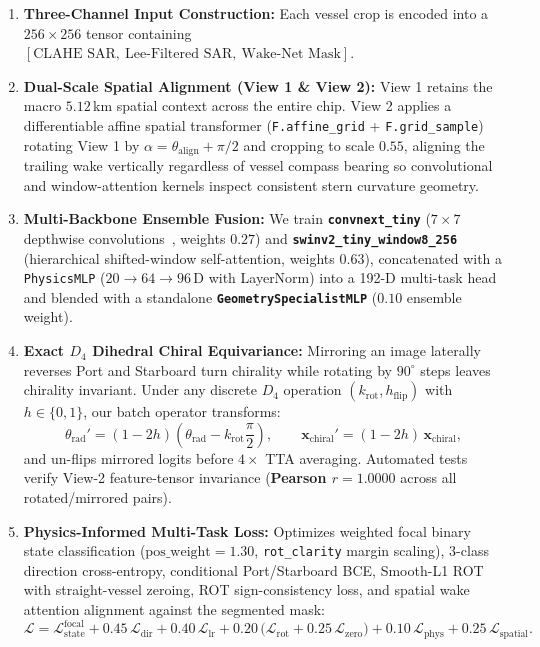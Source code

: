 \documentclass[11pt,a4paper]{article}
\begin{document}
\begin{enumerate}[leftmargin=1.5em]
    \item \textbf{Three-Channel Input Construction:} Each vessel crop is encoded into a $256\times 256$ tensor containing $[\text{CLAHE SAR},\ \text{Lee-Filtered SAR},\ \text{Wake-Net Mask}]$.
    \item \textbf{Dual-Scale Spatial Alignment (View 1 \& View 2):} View 1 retains the macro $5.12$\,km spatial context across the entire chip. View 2 applies a differentiable affine spatial transformer (\texttt{F.affine\_grid} + \texttt{F.grid\_sample}) rotating View 1 by $\alpha = \theta_{\text{align}} + \pi/2$ and cropping to scale $0.55$, aligning the trailing wake vertically regardless of vessel compass bearing so convolutional and window-attention kernels inspect consistent stern curvature geometry.
    \item \textbf{Multi-Backbone Ensemble Fusion:} We train \textbf{\texttt{convnext\_tiny}} ($7\times 7$ depthwise convolutions~\cite{liu2022convnext}, weights $0.27$) and \textbf{\texttt{swinv2\_tiny\_window8\_256}} (hierarchical shifted-window self-attention, weights $0.63$), concatenated with a \texttt{PhysicsMLP} ($20\rightarrow 64\rightarrow 96$\,D with LayerNorm) into a 192-D multi-task head and blended with a standalone \textbf{\texttt{GeometrySpecialistMLP}} ($0.10$ ensemble weight).
    \item \textbf{Exact $D_4$ Dihedral Chiral Equivariance:} Mirroring an image laterally reverses Port and Starboard turn chirality while rotating by $90^\circ$ steps leaves chirality invariant. Under any discrete $D_4$ operation $(k_{\text{rot}}, h_{\text{flip}})$ with $h\in\{0,1\}$, our batch operator transforms:
    \begin{equation}
    \theta_{\text{rad}}' = (1 - 2h)\left(\theta_{\text{rad}} - k_{\text{rot}}\frac{\pi}{2}\right), \qquad \mathbf{x}_{\text{chiral}}' = (1 - 2h)\,\mathbf{x}_{\text{chiral}},
    \end{equation}
    and un-flips mirrored logits before $4\times$ TTA averaging. Automated tests verify View-2 feature-tensor invariance (\textbf{Pearson $r = 1.0000$} across all rotated/mirrored pairs).
    \item \textbf{Physics-Informed Multi-Task Loss:} Optimizes weighted focal binary state classification ($\text{pos\_weight}=1.30$, \texttt{rot\_clarity} margin scaling), 3-class direction cross-entropy, conditional Port/Starboard BCE, Smooth-L1 ROT with straight-vessel zeroing, ROT sign-consistency loss, and spatial wake attention alignment against the segmented mask:
    \begin{equation}
    \mathcal{L} = \mathcal{L}_{\text{state}}^{\text{focal}} + 0.45\,\mathcal{L}_{\text{dir}} + 0.40\,\mathcal{L}_{\text{lr}} + 0.20\,\big(\mathcal{L}_{\text{rot}} + 0.25\,\mathcal{L}_{\text{zero}}\big) + 0.10\,\mathcal{L}_{\text{phys}} + 0.25\,\mathcal{L}_{\text{spatial}}.
    \end{equation}
\end{enumerate}
\end{document}
